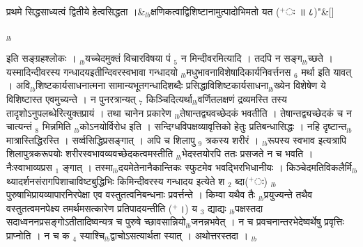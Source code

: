 \documentclass[article,12pt,a4paper]{memoir}%
\newcommand{\add}[1]{($^{+}$#1)}
\begin{document}
	    
	    \stanza[\smallbreak]
	  प्रथमे सिद्धसाध्यत्वं द्वितीये हेत्वसिद्धता ।&{\tiny $_{lb}$}क्षणिकत्वाद्विशिष्टानामुत्पादोभिमतो यत \add{ः ॥ ८}{\normalfontlatin\large\qquad{}"}\&[\smallbreak]
	  
	  
	  
	  \endgroup
	{\tiny $_{lb}$}

	  
	  \pstart \leavevmode%
	इति सङ्ग्रहश्लोकः । {\tiny $_{lb}$}यच्चेदमुक्तं विचारविषया पं {\tiny $_{5}$} न मिन्दीवरमित्यादि । तदपि न सङ्ग{\tiny $_{lb}$}च्छते । यस्मादिन्दीवरस्य गन्धादयइतीन्दिवरस्वभावा गन्धादयो {\tiny $_{lb}$}मधुभावनाविशेषादिकार्यनिवर्त्तनस {\tiny $_{6}$} मर्था इति यावत् । अवि{\tiny $_{lb}$}शिष्टकार्यसाधनात्मना सामान्यभूतगन्धादिशब्दैः प्रसिद्धाविशिष्टकार्यसाधना{\tiny $_{lb}$}ख्येन विशेषेण ये विशिष्टास्त एवमुच्यन्ते । न पुनरत्रान्यत् {\tiny $_{7}$} किञ्चिदित्यर्था{\tiny $_{lb}$}वर्णितलक्षणं द्रव्यमस्ति तस्य तादृशोऽनुपलब्धेरित्युक्तप्रायं । तथा चानेन प्रकारेण {\tiny $_{lb}$}तेषान्तद्व्यवच्छेदकं भवतीति । तेषान्तद्व्यच्छेदकं च न चात्यन्तं {\tiny $_{8}$} भिन्नमिति {\tiny $_{lb}$}कोऽनयोर्विरोध इति । सन्दिग्धविपक्षव्यावृत्तिको हेतुः {\color{DodgerBlue3}प्रतिबन्धासिद्धः} । नहि दृष्टान्त{\tiny $_{lb}$}मात्रास्तिद्धिरस्ति । सर्व्वसिद्धिप्रसङ्गात् । अपि च शिलापु {\tiny $_{9}$} \leavevmode{} त्रकस्य शरीरं । {\tiny $_{lb}$}रूपस्य स्वभाव इत्यत्रापि शिलापुत्रकरूपयोः शरीरस्वभावव्यवच्छेदकत्वमस्तीति {\tiny $_{lb}$}भेदस्तयोरपि ततः प्रसजते न च भवति । नैःस्वाभाव्यप्रस {\tiny $_{1}$} ङ्गात् । तस्मा{\tiny $_{lb}$}दयमेतेनानैकान्तिकः स्फुटमेव भवद्भिरभिधानीयः । किञ्चेदमतिविकलैर्मि{\tiny $_{lb}$}थ्यादर्शनसंरागपिशाचाविष्टबुद्धिभिः किमिन्दीवरस्य गन्धादय इत्येते श {\tiny $_{2}$} ब्दा\add{ः} {\tiny $_{lb}$}पुरुषाभिप्रायव्यापारनिरपेक्षा एव वस्तुतत्वनिबन्धनाः प्रवर्त्तन्ते । किम्वा यथैव तैः {\tiny $_{lb}$}प्रयुज्यन्ते तथैव वस्तुतत्वमनपेक्ष्य तमर्थमसत्कारेण प्रतिपादयन्तीति \add{।} य {\tiny $_{3}$} द्याद्यः {\tiny $_{lb}$}पक्षस्तदा सदाध्वननप्रसङ्गोऽतीतादिष्वन्यत्र च पुरुषे च्छावसान्नियो{\tiny $_{lb}$}जनन्नभवेत् । न च प्रवचनान्तरभेदेष्वर्थेषु प्रवृत्तिः प्राप्नोति । न च क {\tiny $_{4}$} स्याश्चि{\tiny $_{lb}$}द्वाचोऽसत्यार्थता स्यात् । अथोत्तरस्तदा । {\tiny $_{lb}$} 
	    \pend%
	  
\end{document}
